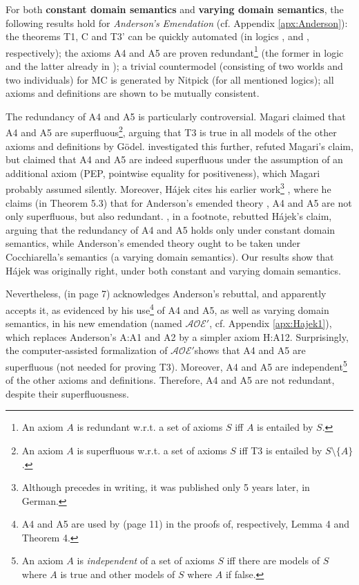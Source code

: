 \documentclass{birkjour}
\newcommand{\AOEH}{$\mathcal{AOE}'$}
\theoremstyle{definition}
\theoremstyle{remark}
\numberwithin{equation}{section}
\begin{document}
For both \textbf{constant domain semantics} and \textbf{varying domain semantics}, the following results hold for \emph{Anderson's Emendation} (cf. Appendix \ref{apx:Anderson}): 
%
the theorems T1, C and T3' can be quickly automated (in logics \K, \K and \KB, respectively);
%
the axioms A4 and A5 are proven redundant\footnote{
  An axiom $A$ is redundant w.r.t. a set of axioms $S$ iff $A$ is entailed by $S$. 
} (the former in
logic \KFourB and the latter already in \K);
%
a trivial countermodel (consisting of two worlds and 
two individuals) for MC is generated by Nitpick (for all mentioned logics); all axioms and definitions are shown to be mutually consistent. 

The redundancy of A4 and A5 is particularly controversial. Magari \cite{Magari1988} claimed that A4 and A5 are superfluous\footnote{
  An axiom $A$ is superfluous w.r.t. a set of axioms $S$ iff T3 is entailed by $S \setminus \{ A \}$.
}, arguing that T3 is true in all models of the other axioms and definitions by Gödel. \citet[p.~5-6]{Hajek_Magari_and_others_1996} investigated this further, refuted Magari's claim, but claimed that A4 and A5 are indeed superfluous under the assumption of an additional axiom (PEP, pointwise equality for positiveness), which Magari probably assumed silently. Moreover, Hájek \citet[p.~2]{Hajek_Magari_and_others_1996} cites his earlier work\footnote{Although \citep{Hajek_der_Mathematiker_2001} precedes \citep{Hajek_Magari_and_others_1996} in writing, it was published only 5 years later, in German.} \citep{Hajek_der_Mathematiker_2001}, where he claims (in Theorem 5.3) that for Anderson's emended theory \citep{anderson90:_some_emend_of_goedel_ontol_proof}, A4 and A5 are not only superfluous, but also redundant. \citet[footnote 1 in p.~1]{AG1996, footnote 1, page 1}, in a footnote, rebutted Hájek's claim, arguing that the redundancy of A4 and A5 holds only under constant domain semantics, while Anderson's emended theory ought to be taken under Cocchiarella's semantics \citep{Cocchiarella} (a varying domain semantics). Our results show that Hájek was originally right, under both constant and varying domain semantics.

Nevertheless, \citet[p.~7]{Hajek2002} (in page 7) acknowledges Anderson's rebuttal, and apparently accepts it, as evidenced by  his use\footnote{
  A4 and A5 are used by \citet[p.~11]{Hajek2002} (page 11) in the proofs of, respectively, Lemma 4 and Theorem 4.
} 
of A4 and A5, as well as varying domain semantics, in his new emendation (named \AOEH \citep[sec.~4]{Hajek2002}, cf. Appendix \ref{apx:Hajek1}), which replaces Anderson's A:A1 and A2 by a simpler axiom H:A12. Surprisingly, the computer-assisted formalization of \AOEH shows that A4 and A5 are superfluous (not needed for proving T3). Moreover, A4 and A5 are independent\footnote{
  An axiom $A$ is \emph{independent} of a set of axioms $S$ iff there are models of $S$ where $A$ is true and other models of $S$ where $A$ if false. 
} of the other axioms and definitions. Therefore, A4 and A5 are not redundant, despite their superfluousness. 
\end{document}
